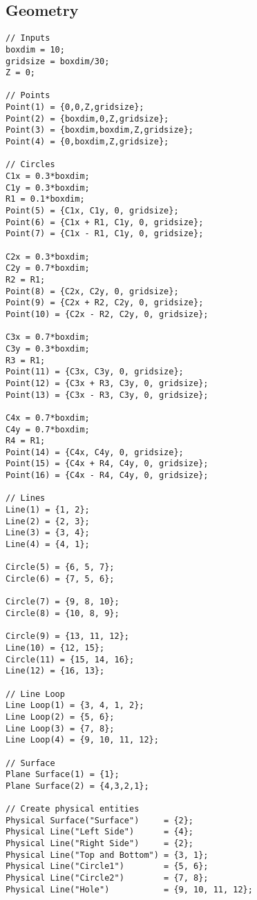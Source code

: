 \begin{appendices}
\section{Geometry}
\begin{verbatim}
// Inputs
boxdim = 10;
gridsize = boxdim/30;
Z = 0; 

// Points
Point(1) = {0,0,Z,gridsize};
Point(2) = {boxdim,0,Z,gridsize};
Point(3) = {boxdim,boxdim,Z,gridsize};
Point(4) = {0,boxdim,Z,gridsize};

// Circles
C1x = 0.3*boxdim;
C1y = 0.3*boxdim;
R1 = 0.1*boxdim;
Point(5) = {C1x, C1y, 0, gridsize};
Point(6) = {C1x + R1, C1y, 0, gridsize};
Point(7) = {C1x - R1, C1y, 0, gridsize};

C2x = 0.3*boxdim;
C2y = 0.7*boxdim;
R2 = R1;
Point(8) = {C2x, C2y, 0, gridsize};
Point(9) = {C2x + R2, C2y, 0, gridsize};
Point(10) = {C2x - R2, C2y, 0, gridsize};

C3x = 0.7*boxdim;
C3y = 0.3*boxdim;
R3 = R1;
Point(11) = {C3x, C3y, 0, gridsize};
Point(12) = {C3x + R3, C3y, 0, gridsize};
Point(13) = {C3x - R3, C3y, 0, gridsize};

C4x = 0.7*boxdim;
C4y = 0.7*boxdim;
R4 = R1;
Point(14) = {C4x, C4y, 0, gridsize};
Point(15) = {C4x + R4, C4y, 0, gridsize};
Point(16) = {C4x - R4, C4y, 0, gridsize};

// Lines
Line(1) = {1, 2};
Line(2) = {2, 3};
Line(3) = {3, 4};
Line(4) = {4, 1};

Circle(5) = {6, 5, 7};
Circle(6) = {7, 5, 6};

Circle(7) = {9, 8, 10};
Circle(8) = {10, 8, 9};

Circle(9) = {13, 11, 12};
Line(10) = {12, 15};
Circle(11) = {15, 14, 16};
Line(12) = {16, 13};

// Line Loop
Line Loop(1) = {3, 4, 1, 2};
Line Loop(2) = {5, 6};
Line Loop(3) = {7, 8};
Line Loop(4) = {9, 10, 11, 12}; 

// Surface
Plane Surface(1) = {1};
Plane Surface(2) = {4,3,2,1};

// Create physical entities
Physical Surface("Surface") 	= {2};
Physical Line("Left Side") 		= {4};
Physical Line("Right Side") 	= {2};
Physical Line("Top and Bottom") = {3, 1};
Physical Line("Circle1")		= {5, 6};
Physical Line("Circle2")		= {7, 8};
Physical Line("Hole")			= {9, 10, 11, 12}; 

\end{verbatim}

\end{appendices}